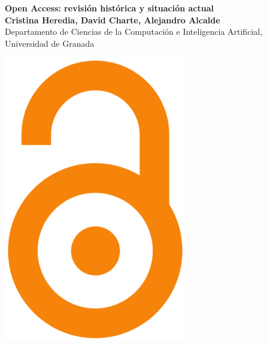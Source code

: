 \documentclass[a0,portrait]{a0poster}
\begin{document}


\begin{minipage}[t]{0.75\linewidth}
  \vspace{0pt}
  \flushleft
  \VeryHuge \color{openaccess} \textbf{\sffamily Open Access: revisión histórica y situación actual} \color{Black}
  \\ %

  \vspace{1cm} %
  \large \textbf{Cristina Heredia, David Charte, Alejandro Alcalde}\\[0.5cm] %
  \large Departamento de Ciencias de la Computación e Inteligencia Artificial, Universidad de Granada\\[0.5cm] %
\end{minipage}
\hfill
\begin{minipage}[t]{0.15\textwidth}
  \vspace{0.5em}
  \centering\includegraphics[width=0.60\textwidth]{openaccess_logo.png}
\end{minipage}
%
\vspace{2cm} %
\end{document}
